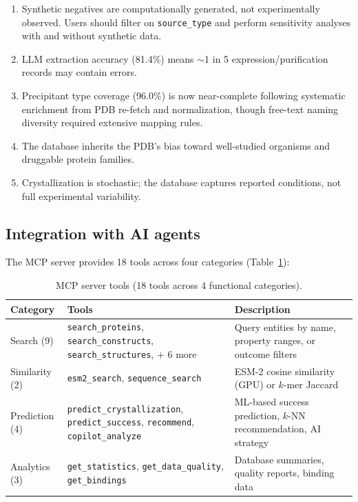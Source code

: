 \documentclass[11pt]{article}
\begin{document}
\begin{enumerate}
  \item Synthetic negatives are computationally generated, not experimentally observed. Users should filter on \texttt{source\_type} and perform sensitivity analyses with and without synthetic data.
  \item LLM extraction accuracy (81.4\%) means $\sim$1 in 5 expression/purification records may contain errors.
  \item Precipitant type coverage (96.0\%) is now near-complete following systematic enrichment from PDB re-fetch and normalization, though free-text naming diversity required extensive mapping rules.
  \item The database inherits the PDB's bias toward well-studied organisms and druggable protein families.
  \item Crystallization is stochastic; the database captures reported conditions, not full experimental variability.
\end{enumerate}

\subsection*{Integration with AI agents}

The MCP server provides 18 tools across four categories (Table~\ref{tab:mcp}):

\begin{table}[H]
\centering
\caption{MCP server tools (18 tools across 4 functional categories).}
\label{tab:mcp}
\small
\begin{tabularx}{\textwidth}{lp{4cm}X}
\toprule
\textbf{Category} & \textbf{Tools} & \textbf{Description} \\
\midrule
Search (9) & \texttt{search\_proteins}, \texttt{search\_constructs}, \texttt{search\_structures}, + 6 more & Query entities by name, property ranges, or outcome filters \\
Similarity (2) & \texttt{esm2\_search}, \texttt{sequence\_search} & ESM-2 cosine similarity (GPU) or $k$-mer Jaccard \\
Prediction (4) & \texttt{predict\_crystallization}, \texttt{predict\_success}, \texttt{recommend}, \texttt{copilot\_analyze} & ML-based success prediction, $k$-NN recommendation, AI strategy \\
Analytics (3) & \texttt{get\_statistics}, \texttt{get\_data\_quality}, \texttt{get\_bindings} & Database summaries, quality reports, binding data \\
\bottomrule
\end{tabularx}
\end{table}
\end{document}
